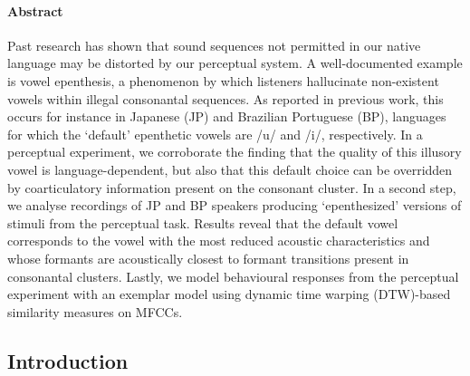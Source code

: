 \paragraph{Abstract}
Past research has shown that sound sequences not permitted in our native language may be distorted by our perceptual system. A well-documented example is vowel epenthesis, a phenomenon by which listeners hallucinate non-existent vowels within illegal consonantal sequences. As reported in previous work, this occurs for instance in Japanese (JP) and Brazilian Portuguese (BP), languages for which the `default' epenthetic vowels are /u/ and /i/, respectively. In a perceptual experiment, we corroborate the finding that the quality of this illusory vowel is language-dependent, but also that this default choice can be overridden by coarticulatory information present on the consonant cluster. In a second step, we analyse recordings of JP and BP speakers producing `epenthesized' versions of stimuli from the perceptual task. Results reveal that the default vowel corresponds to the vowel with the most reduced acoustic characteristics and whose formants are acoustically closest to formant transitions present in consonantal clusters. Lastly, we model behavioural responses from the perceptual experiment with an exemplar model using dynamic time warping (DTW)-based similarity measures on MFCCs. 

\subsection{Introduction}

